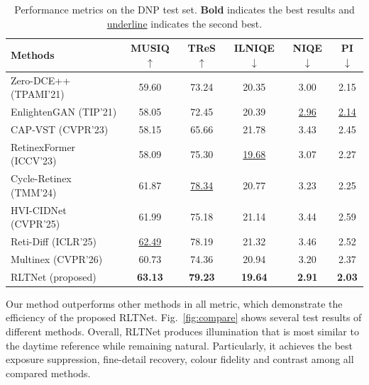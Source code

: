 \documentclass{article}
\begin{document}
\begin{table}[htbp]
\setlength{\tabcolsep}{2pt}
\fontsize{8}{8}\selectfont
\caption{Performance metrics on the DNP test set. \textbf{Bold} indicates the best results and \underline{underline} indicates the second best.}
\label{tab:dnp}
\centering
\begin{tabular}{l|ccccc}
\hline
\textbf{Methods} & \textbf{MUSIQ}$\uparrow$ & \textbf{TReS}$\uparrow$ & \textbf{ILNIQE}$\downarrow$ & \textbf{NIQE}$\downarrow$ & \textbf{PI}$\downarrow$ \\
\hline
Zero-DCE++ (TPAMI'21)  & 59.60 & 73.24 & 20.35 & 3.00 & 2.15 \\
EnlightenGAN (TIP'21)  & 58.05 & 72.45 & 20.39 & \underline{2.96} & \underline{2.14} \\
CAP-VST (CVPR'23)       & 58.15 & 65.66 & 21.78 & 3.43 & 2.45 \\
RetinexFormer (ICCV'23) & 58.09 & 75.30 & \underline{19.68} & 3.07 & 2.27 \\
Cycle-Retinex (TMM'24) & 61.87 & \underline{78.34} & 20.77 & 3.23 & 2.25 \\
HVI-CIDNet (CVPR'25)    & 61.99 & 75.18 & 21.14 & 3.44 & 2.59 \\
Reti-Diff (ICLR'25)     & \underline{62.49} & 78.19 & 21.32 & 3.46 & 2.52 \\
Multinex (CVPR'26)      & 60.73 & 74.36 & 20.94 & 3.20 & 2.37 \\
\hline
RLTNet (proposed)& \textbf{63.13} & \textbf{79.23} & \textbf{19.64} & \textbf{2.91} & \textbf{2.03} \\
\hline
\end{tabular}
\end{table}



Our method outperforms other methods in all metric, which demonstrate the efficiency of the proposed RLTNet. Fig.~\ref{fig:compare} shows several test results of different methods. Overall, RLTNet produces illumination that is most similar to the daytime reference while remaining natural. Particularly, it achieves the best exposure suppression, fine-detail recovery, colour fidelity and contrast among all compared methods.




\end{document}
